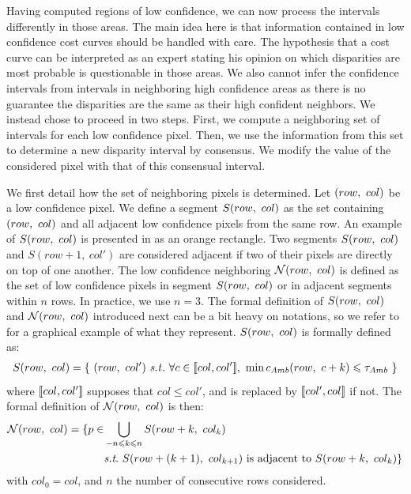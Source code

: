Having computed regions of low confidence, we can now process the intervals differently in those areas. The main idea here is that information contained in low confidence cost curves should be handled with care. The hypothesis that a cost curve can be interpreted as an expert stating his opinion on which disparities are most probable is questionable in those areas. We also cannot infer the confidence intervals from intervals in neighboring high confidence areas as there is no guarantee the disparities are the same as their high confident neighbors. We instead chose to proceed in two steps. First, we compute a neighboring set of intervals for each low confidence pixel. Then, we use the information from this set to determine a new disparity interval by consensus. We modify the value of the considered pixel with that of this consensual interval.

We first detail how the set of neighboring pixels is determined. Let $(row, ~col)$ be a low confidence pixel. We define a segment $S(row, ~col)$ as the set containing $(row, ~col)$ and all adjacent low confidence pixels from the same row. An example of $S(row, ~col)$ is presented in  as an orange rectangle. Two segments $S(row, ~col)$ and $S(row+1, ~col')$ are considered adjacent if two of their pixels are directly on top of one another. The low confidence neighboring $\mathcal{N}(row,~col)$ is defined as the set of low confidence pixels in segment $S(row, ~col)$ or in adjacent segments within $n$ rows. In practice, we use $n=3$. The formal definition of $S(row, ~col)$ and $\mathcal{N}(row,~col)$  introduced next can be a bit heavy on notations, so we refer to  for a graphical example of what they represent. $S(row, ~col)$ is formally defined as:
\begin{align}
    S(\rowcol) = \{~ (row,~col') \text{ \st }~\forall c\in\opi col, col'\cli,~\min c_{Amb}(row, ~c+k)\leqslant \tau_{Amb}~\}
\end{align}
where $[\![ col, col']\!]$ supposes that $col\leqslant col'$, and is replaced by $[\![ col', col]\!]$ if not. The formal definition of $\mathcal{N}(row,~col)$ is then:
\begin{align}
    \N(row,~col) = \{ p\in &\bigcup_{-n\leqslant k\leqslant n}S(row+k, ~col_k)\nonumber\\
    &\st~S(row + (k+1), ~col_{k+1})\text{ is adjacent to }S(row+k, ~col_{k})\}
\end{align}
with $col_0=col$, and $n$ the number of consecutive rows considered.

